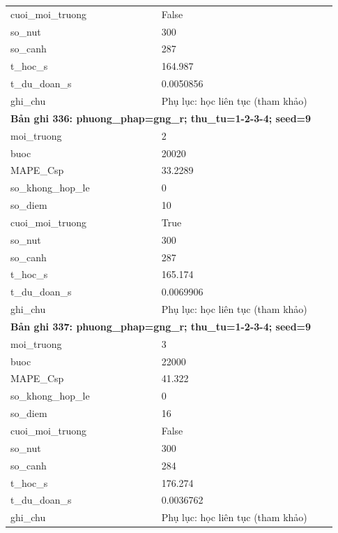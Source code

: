 \begin{longtable}{p{0.43\linewidth}p{0.50\linewidth}}
cuoi\_\allowbreak moi\_\allowbreak truong & False \\
so\_\allowbreak nut & 300 \\
so\_\allowbreak canh & 287 \\
t\_\allowbreak hoc\_\allowbreak s & 164.987 \\
t\_\allowbreak du\_\allowbreak doan\_\allowbreak s & 0.0050856 \\
ghi\_\allowbreak chu & Phụ lục: học liên tục (tham khảo) \\
\midrule
\multicolumn{2}{p{0.95\linewidth}}{\textbf{Bản ghi 336: phuong\_phap=gng\_r; thu\_tu=1-2-3-4; seed=9}} \\
moi\_\allowbreak truong & 2 \\
buoc & 20020 \\
MAPE\_\allowbreak Csp & 33.2289 \\
so\_\allowbreak khong\_\allowbreak hop\_\allowbreak le & 0 \\
so\_\allowbreak diem & 10 \\
cuoi\_\allowbreak moi\_\allowbreak truong & True \\
so\_\allowbreak nut & 300 \\
so\_\allowbreak canh & 287 \\
t\_\allowbreak hoc\_\allowbreak s & 165.174 \\
t\_\allowbreak du\_\allowbreak doan\_\allowbreak s & 0.0069906 \\
ghi\_\allowbreak chu & Phụ lục: học liên tục (tham khảo) \\
\midrule
\multicolumn{2}{p{0.95\linewidth}}{\textbf{Bản ghi 337: phuong\_phap=gng\_r; thu\_tu=1-2-3-4; seed=9}} \\
moi\_\allowbreak truong & 3 \\
buoc & 22000 \\
MAPE\_\allowbreak Csp & 41.322 \\
so\_\allowbreak khong\_\allowbreak hop\_\allowbreak le & 0 \\
so\_\allowbreak diem & 16 \\
cuoi\_\allowbreak moi\_\allowbreak truong & False \\
so\_\allowbreak nut & 300 \\
so\_\allowbreak canh & 284 \\
t\_\allowbreak hoc\_\allowbreak s & 176.274 \\
t\_\allowbreak du\_\allowbreak doan\_\allowbreak s & 0.0036762 \\
ghi\_\allowbreak chu & Phụ lục: học liên tục (tham khảo) \\

\end{longtable}
